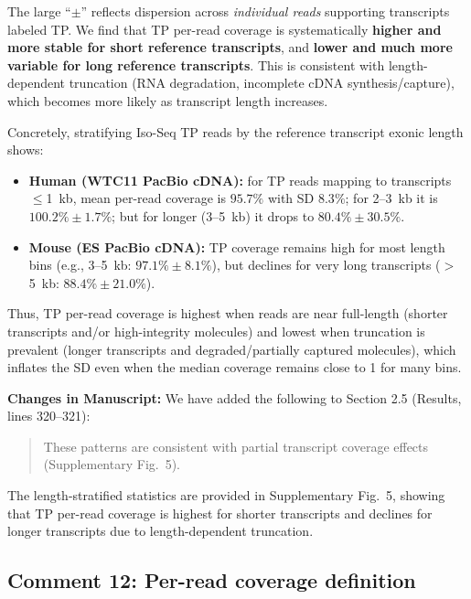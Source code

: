 \documentclass[11pt]{article}
\begin{document}
\begin{responseboxnew}
The large ``$\pm$'' reflects dispersion across \emph{individual reads} supporting transcripts labeled TP. We find that TP per-read coverage is systematically \textbf{higher and more stable for short reference transcripts}, and \textbf{lower and much more variable for long reference transcripts}. This is consistent with length-dependent truncation (RNA degradation, incomplete cDNA synthesis/capture), which becomes more likely as transcript length increases.

Concretely, stratifying Iso-Seq TP reads by the reference transcript exonic length shows:
\begin{itemize}
    \item \textbf{Human (WTC11 PacBio cDNA):} for TP reads mapping to transcripts $\leq$1~kb, mean per-read coverage is $95.7\%$ with SD $8.3\%$; for 2--3~kb it is $100.2\% \pm 1.7\%$; but for longer (3--5~kb) it drops to $80.4\% \pm 30.5\%$.
    \item \textbf{Mouse (ES PacBio cDNA):} TP coverage remains high for most length bins (e.g., 3--5~kb: $97.1\% \pm 8.1\%$), but declines for very long transcripts ($>$5~kb: $88.4\% \pm 21.0\%$).
\end{itemize}
Thus, TP per-read coverage is highest when reads are near full-length (shorter transcripts and/or high-integrity molecules) and lowest when truncation is prevalent (longer transcripts and degraded/partially captured molecules), which inflates the SD even when the median coverage remains close to 1 for many bins.

\vspace{0.3cm}
\textbf{Changes in Manuscript:} We have added the following to Section 2.5 (Results, lines 320--321):

\begin{quote}
These patterns are consistent with partial transcript coverage effects (Supplementary Fig.~5).
\end{quote}

The length-stratified statistics are provided in Supplementary Fig.~5, showing that TP per-read coverage is highest for shorter transcripts and declines for longer transcripts due to length-dependent truncation.
\end{responseboxnew}

\subsection{Comment 12: Per-read coverage definition}
\end{document}
